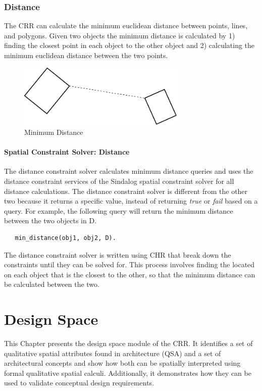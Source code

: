 \documentclass[12pt]{ucthesis}
\begin{document}
\subsection{Distance}
The CRR can calculate the minimum euclidean distance between points, lines, and polygons. Given two objects the minimum distance is calculated by 1) finding the closest point in each object to the other object and 2) calculating the minimum euclidean distance between the two points. 

\begin{figure}[H]
\centering
\includegraphics[width=80mm]{min-dist}
\caption{Minimum Distance}
\label{min-dist}
\end{figure}

\subsubsection{Spatial Constraint Solver: Distance}
The distance constraint solver calculates minimum distance queries and uses the distance constraint services of the Sindalog \cite{Almendros-Jimenez} spatial constraint solver for all distance calculations. The distance constraint solver is different from the other two because it returns a specific value, instead of returning \emph{true} or \emph{fail} based on a query. For example, the following query will return the minimum distance between the two objects in D.
\begin{verbatim}
   min_distance(obj1, obj2, D). 
\end{verbatim}

The distance constraint solver is written using CHR that break down the constraints until they can be solved for. This process involves finding the located on each object that is the closest to the other, so that the minimum distance can be calculated between the two. 


\chapter{Design Space} \label{design space}
This Chapter presents the design space module of the CRR. It identifies a set of qualitative spatial attributes found in architecture (QSA) and a set of architectural concepts and show how both can be spatially interpreted using formal qualitative spatial calculi. Additionally, it demonstrates how they can be used to validate conceptual design requirements. 
\end{document}
